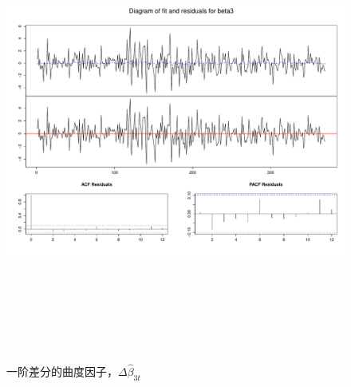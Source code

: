        \begin{figure}%
    \includegraphics[width=15cm,height=15cm]{figures/Rplot14}
   \caption{一阶差分的曲度因子，$\Delta\hat{\beta}_{3t}$}
   \label{Rplot14}
  \end{figure}
